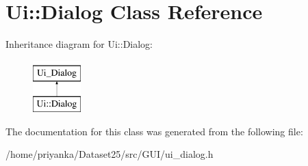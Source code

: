 \hypertarget{classUi_1_1Dialog}{\section{\-Ui\-:\-:\-Dialog \-Class \-Reference}
\label{classUi_1_1Dialog}
}
\-Inheritance diagram for \-Ui\-:\-:\-Dialog\-:\begin{figure}[H]
\begin{center}
\leavevmode
\includegraphics[height=2.000000cm]{classUi_1_1Dialog}
\end{center}
\end{figure}


\-The documentation for this class was generated from the following file\-:\begin{DoxyCompactItemize}
\item 
/home/priyanka/\-Dataset25/src/\-G\-U\-I/ui\-\_\-dialog.\-h\end{DoxyCompactItemize}
